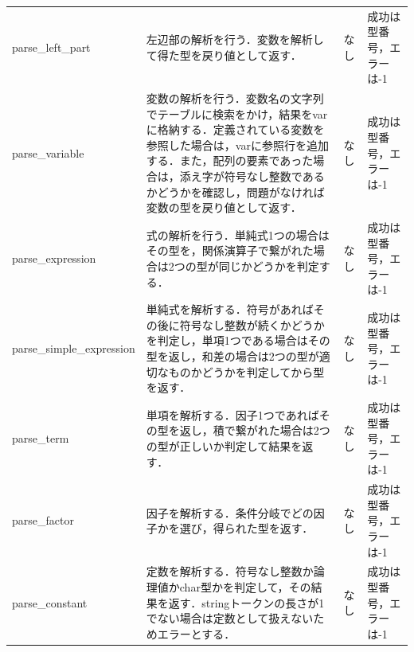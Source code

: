 \documentclass{jlreq}
\begin{document}
\begin{table}[H]
{\begin{tabular}{|l|p{15cm}|l|p{6cm}|}
      parse\_left\_part               & 左辺部の解析を行う．変数を解析して得た型を戻り値として返す．                                                                                                                                                                                                   & なし & 成功は型番号，エラーは-1           \\
      parse\_variable                 & 変数の解析を行う．変数名の文字列でテーブルに検索をかけ，結果をvarに格納する．定義されている変数を参照した場合は，varに参照行を追加する．また，配列の要素であった場合は，添え字が符号なし整数であるかどうかを確認し，問題がなければ変数の型を戻り値として返す． & なし & 成功は型番号，エラーは-1           \\
      parse\_expression               & 式の解析を行う．単純式1つの場合はその型を，関係演算子で繋がれた場合は2つの型が同じかどうかを判定する．                                                                                                                                                         & なし & 成功は型番号，エラーは-1           \\
      parse\_simple\_expression       & 単純式を解析する．符号があればその後に符号なし整数が続くかどうかを判定し，単項1つである場合はその型を返し，和差の場合は2つの型が適切なものかどうかを判定してから型を返す．                                                                                     & なし & 成功は型番号，エラーは-1           \\
      parse\_term                     & 単項を解析する．因子1つであればその型を返し，積で繋がれた場合は2つの型が正しいか判定して結果を返す．                                                                                                                                                           & なし & 成功は型番号，エラーは-1           \\
      parse\_factor                   & 因子を解析する．条件分岐でどの因子かを選び，得られた型を返す．                                                                                                                                                                                                 & なし & 成功は型番号，エラーは-1           \\
      parse\_constant                 & 定数を解析する．符号なし整数か論理値かchar型かを判定して，その結果を返す．stringトークンの長さが1でない場合は定数として扱えないためエラーとする．                                                                                                              & なし & 成功は型番号，エラーは-1           \\

\end{tabular}}
\end{table}
\end{document}
